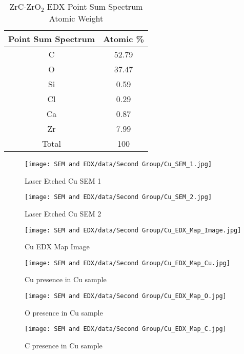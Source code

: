 \documentclass[11pt]{article}
\begin{document}
	\begin{table}[!ht]
		\centering
		\caption{ZrC-ZrO$_2$ EDX Point Sum Spectrum Atomic Weight}
		\begin{tabular}{cc}
			\toprule
			Point Sum Spectrum & Atomic \% \\
			\midrule
			C & 52.79 \\
			O & 37.47 \\
			Si & 0.59 \\
			Cl & 0.29 \\
			Ca & 0.87 \\
			Zr & 7.99 \\
			\midrule
			Total & 100 \\
			\bottomrule
		\end{tabular}%
		\label{tab:ZrC_EDX_Point_Atomic_Weight}%
	\end{table}%
	
	
	\begin{figure}[!ht]
		\centering
		\begin{minipage}{0.45\textwidth}
			\centering
			\texttt{[image: SEM and EDX/data/Second Group/Cu\_SEM\_1.jpg]}
			\caption{Laser Etched Cu SEM 1}
			\label{fig:Cu_SEM_1}
		\end{minipage}
		\begin{minipage}{0.45\textwidth}
			\centering
			\texttt{[image: SEM and EDX/data/Second Group/Cu\_SEM\_2.jpg]}
			\caption{Laser Etched Cu SEM 2}
			\label{fig:Cu_SEM_2}
		\end{minipage}
	\end{figure}
	
	\begin{figure}[!ht]
		\centering
		\texttt{[image: SEM and EDX/data/Second Group/Cu\_EDX\_Map\_Image.jpg]}
		\caption{Cu EDX Map Image}
		\label{fig:Cu_EDX_Map_Image}
	\end{figure}
	
\clearpage
	
	\begin{figure}[!ht]
		\begin{minipage}{0.33\textwidth}
			\centering
			\texttt{[image: SEM and EDX/data/Second Group/Cu\_EDX\_Map\_Cu.jpg]}
			\caption{Cu presence in Cu sample}
			\label{fig:Cu_EDX_Map_Cu}
		\end{minipage}
		\begin{minipage}{0.33\textwidth}
			\centering
			\texttt{[image: SEM and EDX/data/Second Group/Cu\_EDX\_Map\_O.jpg]}
			\caption{O presence in Cu sample}
			\label{fig:Cu_EDX_Map_O}
		\end{minipage}
		\begin{minipage}{0.33\textwidth}
			\centering
			\texttt{[image: SEM and EDX/data/Second Group/Cu\_EDX\_Map\_C.jpg]}
			\caption{C presence in Cu sample}
			\label{fig:Cu_EDX_Map_C}
		\end{minipage}
	\end{figure}
	
\end{document}
